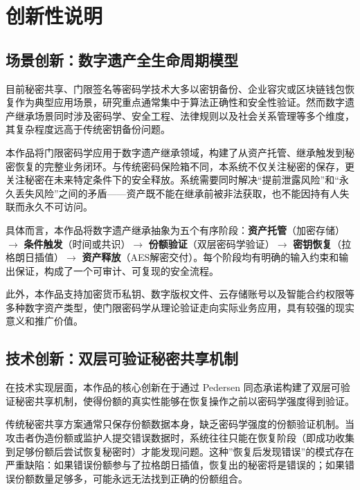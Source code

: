 \documentclass[UTF8,a4paper,zihao=-4,openany]{ctexrep}
\begin{document}
\chapter{创新性说明}

\section{场景创新：数字遗产全生命周期模型}

目前秘密共享、门限签名等密码学技术大多以密钥备份、企业容灾或区块链钱包恢复作为典型应用场景，研究重点通常集中于算法正确性和安全性验证。然而数字遗产继承场景同时涉及密码学、安全工程、法律规则以及社会关系管理等多个维度，其复杂程度远高于传统密钥备份问题。

本作品将门限密码学应用于数字遗产继承领域，构建了从资产托管、继承触发到秘密恢复的完整业务闭环。与传统密码保险箱不同，本系统不仅关注秘密的保存，更关注秘密在未来特定条件下的安全释放。系统需要同时解决“提前泄露风险”和“永久丢失风险”之间的矛盾——资产既不能在继承前被非法获取，也不能因持有人失联而永久不可访问。

具体而言，本作品将数字遗产继承抽象为五个有序阶段：\textbf{资产托管}（加密存储）$\to$ \textbf{条件触发}（时间或共识）$\to$ \textbf{份额验证}（双层密码学验证）$\to$ \textbf{密钥恢复}（拉格朗日插值）$\to$ \textbf{资产释放}（AES解密交付）。每个阶段均有明确的输入约束和输出保证，构成了一个可审计、可复现的安全流程。

此外，本作品支持加密货币私钥、数字版权文件、云存储账号以及智能合约权限等多种数字资产类型，使门限密码学从理论验证走向实际业务应用，具有较强的现实意义和推广价值。

\section{技术创新：双层可验证秘密共享机制}

在技术实现层面，本作品的核心创新在于通过 Pedersen 同态承诺构建了双层可验证秘密共享机制，使得份额的真实性能够在恢复操作之前以密码学强度得到验证。

传统秘密共享方案通常只保存份额数据本身，缺乏密码学强度的份额验证机制。当攻击者伪造份额或监护人提交错误数据时，系统往往只能在恢复阶段（即成功收集到足够份额后尝试恢复秘密时）才能发现问题。这种”恢复后发现错误”的模式存在严重缺陷：如果错误份额参与了拉格朗日插值，恢复出的秘密将是错误的；如果错误份额数量足够多，可能永远无法找到正确的份额组合。
\end{document}
